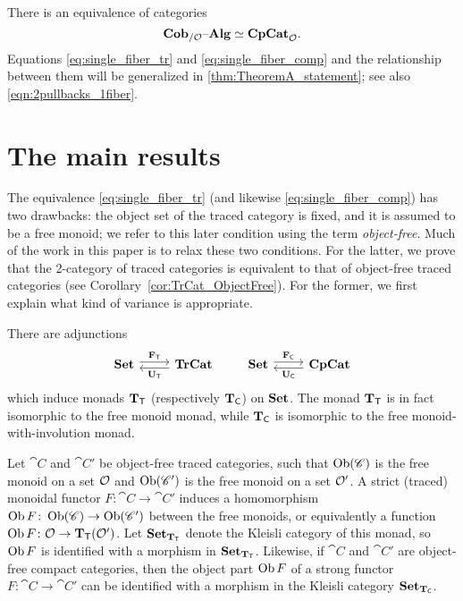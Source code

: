 \documentclass[11pt,oneside,article]{memoir}
\begin{document}
There is an equivalence of categories
\begin{equation}\label{eq:single_fiber_comp}
   \mathbf{Cob}_{/\mathcal{O}}{\text \textendash}\mathbf{Alg}\simeq\mathbf{CpCat}_{\mathcal{O}}.
\end{equation}
Equations \eqref{eq:single_fiber_tr} and \eqref{eq:single_fiber_comp} and the relationship between them will be generalized in \ref{thm:TheoremA_statement}; see also \eqref{eqn:2pullbacks_1fiber}.

\section{The main results}\label{subsec:main_results}

The equivalence \eqref{eq:single_fiber_tr} (and likewise \eqref{eq:single_fiber_comp}) has two
drawbacks: the object set of the traced category is fixed, and it is assumed to be a free monoid; we
refer to this later condition using the term \emph{object-free}. Much of the work in this paper is
to relax these two conditions. For the latter, we prove that the 2-category of traced categories is
equivalent to that of object-free traced categories (see Corollary~\ref{cor:TrCat_ObjectFree}). For
the former, we first explain what kind of variance is appropriate.

There are adjunctions
\begin{equation*}
   \Adjoint{\Set}{\TrCat}{\FT}{\UT}
   \qquad
   \Adjoint{\Set}{\CompCat}{\FC}{\UC}
\end{equation*}
which induce monads $\mathbf{T}_{\mathsf{T}}$ (respectively $\mathbf{T}_{\mathsf{C}}$) on $\mathbf{Set}$. The monad $\mathbf{T}_{\mathsf{T}}$ is in fact isomorphic to
the free monoid monad, while $\mathbf{T}_{\mathsf{C}}$ is isomorphic to the free monoid-with-involution monad.

Let $\cat{C}$ and $\cat{C}'$ be object-free traced categories, such that $\operatorname{Ob}(\mathscr{C})$ is the free
monoid on a set $\mathcal{O}$ and $\operatorname{Ob}(\mathscr{C}')$ is the free monoid on a set $\mathcal{O}'$. A strict
(traced) monoidal functor $F\colon \cat{C}\to \cat{C}'$ induces a homomorphism
$\operatorname{Ob} F\colon\operatorname{Ob}(\mathscr{C})\to\operatorname{Ob}(\mathscr{C}')$ between the free monoids, or equivalently a function $\operatorname{Ob}
F\colon\mathcal{O}\to\mathbf{T}_{\mathsf{T}}(\mathcal{O}')$. Let $\mathbf{Set}_{\mathbf{T}_{\mathsf{T}}}$ denote the Kleisli category of this monad, so $\operatorname{Ob}
F$ is identified with a morphism in $\mathbf{Set}_{\mathbf{T}_{\mathsf{T}}}$. Likewise, if $\cat{C}$ and $\cat{C}'$ are
object-free compact categories, then the object part $\operatorname{Ob} F$ of a strong functor
$F\colon\cat{C}\to\cat{C}'$ can be identified with a morphism in the Kleisli category $\mathbf{Set}_{\mathbf{T}_{\mathsf{C}}}$.
\end{document}
